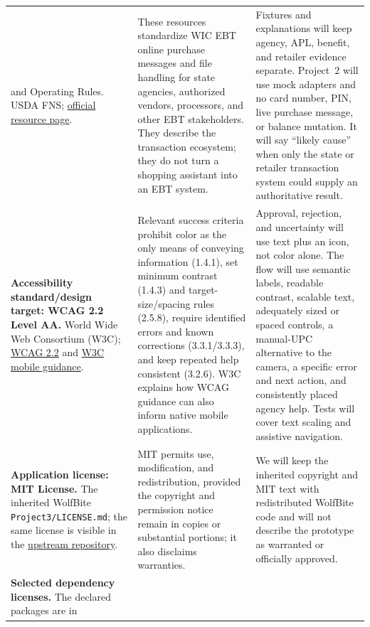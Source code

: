 \documentclass[sigconf]{acmart}
\begin{document}
\begin{table}[t]
\begin{tabular}{L{3.8cm}L{5.1cm}L{6.1cm}}
{    and Operating Rules.} USDA FNS;
    \href{https://www.fns.usda.gov/wic/ebt/technical-implementation-guide-operating-rules}{official resource page}. &
    These resources standardize WIC EBT online purchase messages and file
    handling for state agencies, authorized vendors, processors, and other EBT
    stakeholders.  They describe the transaction ecosystem; they do not turn
    a shopping assistant into an EBT system. &
    Fixtures and explanations will keep agency, APL, benefit, and retailer
    evidence separate.  Project~2 will use mock adapters and no card number,
    PIN, live purchase message, or balance mutation.  It will say ``likely
    cause'' when only the state or retailer transaction system could supply an
    authoritative result. \\
    \addlinespace[0.2em]
    \textbf{Accessibility standard/design target: WCAG 2.2 Level AA.}
    World Wide Web Consortium (W3C);
    \href{https://www.w3.org/TR/WCAG22/}{WCAG 2.2} and
    \href{https://www.w3.org/WAI/standards-guidelines/mobile/}{W3C mobile guidance}. &
    Relevant success criteria prohibit color as the only means of conveying
    information (1.4.1), set minimum contrast (1.4.3) and target-size/spacing
    rules (2.5.8), require identified errors and known corrections
    (3.3.1/3.3.3), and keep repeated help consistent (3.2.6).  W3C explains how
    WCAG guidance can also inform native mobile applications. &
    Approval, rejection, and uncertainty will use text plus an icon, not color
    alone.  The flow will use semantic labels, readable contrast, scalable
    text, adequately sized or spaced controls, a manual-UPC alternative to the
    camera, a specific error and next action, and consistently placed agency
    help.  Tests will cover text scaling and assistive navigation. \\
    \addlinespace[0.2em]
    \textbf{Application license: MIT License.} The inherited WolfBite
    \texttt{Project3/LICENSE.md}; the same license is visible in the
    \href{https://github.com/SuyeshJadhav/CSC510_G19/blob/main/Project2/LICENSE.md}{upstream repository}. &
    MIT permits use, modification, and redistribution, provided the copyright
    and permission notice remain in copies or substantial portions; it also
    disclaims warranties. &
    We will keep the inherited copyright and MIT text with redistributed
    WolfBite code and will not describe the prototype as warranted or officially
    approved. \\
    \addlinespace[0.2em]
    \textbf{Selected dependency licenses.} The declared packages are in

\end{tabular}
\end{table}
\end{document}
